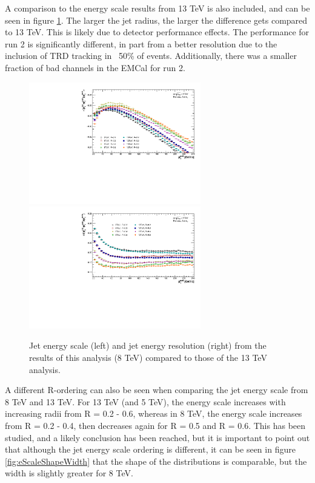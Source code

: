 \documentclass[ALICE]{ALICE_analysis_notes}
\begin{document}
A comparison to the energy scale results from 13 TeV is also included, and can be seen in figure \ref{fig:EnergyScaleComp}. The larger the jet radius, the larger the difference gets compared to 13 TeV. This is likely due to detector performance effects. The performance for run 2 is significantly different, in part from a better resolution due to the inclusion of TRD tracking in ~50\% of events. Additionally, there was a smaller fraction of bad channels in the EMCal for run 2.

\begin{figure}[h!]
    \centering
    \begin{multicols}{2}
            \includegraphics[width=7.5cm]{figures/EnergyScale/EnergyScaleMean_Comparison.pdf}
        \vfill\null 
        \columnbreak
            \includegraphics[width=7.5cm]{figures/EnergyScale/EnergyScaleWidth_Comparison.pdf}
        \vfill\null
    \end{multicols}
    \caption{Jet energy scale (left) and jet energy resolution (right) from the results of this analysis (8 TeV) compared to those of the 13 TeV analysis.}
    \label{fig:EnergyScaleComp}
\end{figure}

A different R-ordering can also be seen when comparing the jet energy scale from 8 TeV and 13 TeV. For 13 TeV (and 5 TeV), the energy scale increases with increasing radii from R = 0.2 - 0.6, whereas in 8 TeV, the energy scale increases from R = 0.2 - 0.4, then decreases again for R = 0.5 and R = 0.6. This has been studied, and a likely conclusion has been reached, but it is important to point out that although the jet energy scale ordering is different, it can be seen in figure \ref{fig:eScaleShapeWidth} that the shape of the distributions is comparable, but the width is slightly greater for 8 TeV.
\end{document}
